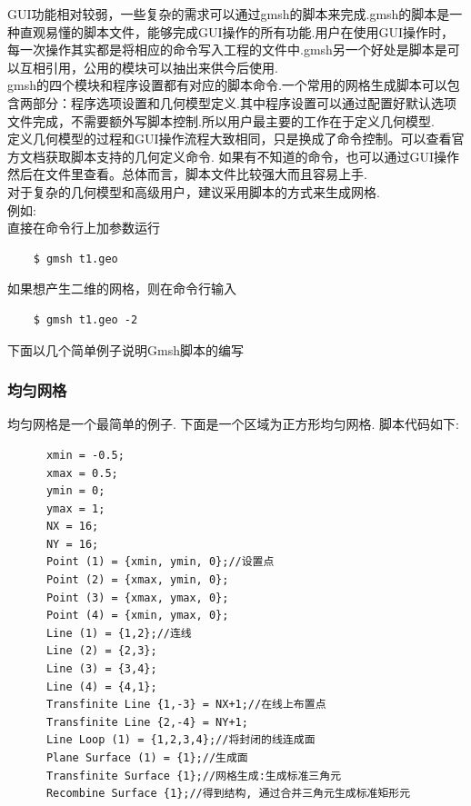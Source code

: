 \documentclass[12pt]{article}
\begin{document}
\begin{CJK}{UTF8}{gkai}
\qquad GUI功能相对较弱，一些复杂的需求可以通过gmsh的脚本来完成.gmsh的脚本是一种直观易懂的脚本文件，能够完成GUI操作的所有功能.用户在使用GUI操作时，每一次操作其实都是将相应的命令写入工程的文件中.gmsh另一个好处是脚本是可以互相引用，公用的模块可以抽出来供今后使用.\\
	
	gmsh的四个模块和程序设置都有对应的脚本命令.一个常用的网格生成脚本可以包含两部分：程序选项设置和几何模型定义.其中程序设置可以通过配置好默认选项文件完成，不需要额外写脚本控制.所以用户最主要的工作在于定义几何模型.\\
	
	定义几何模型的过程和GUI操作流程大致相同，只是换成了命令控制。可以查看官方文档获取脚本支持的几何定义命令. 如果有不知道的命令，也可以通过GUI操作然后在文件里查看。总体而言，脚本文件比较强大而且容易上手.\\
	
	对于复杂的几何模型和高级用户，建议采用脚本的方式来生成网格.\\
		
	例如:\\	
	
	直接在命令行上加参数运行	
	\begin{verbatim}
	$ gmsh t1.geo
	\end{verbatim}
	
	如果想产生二维的网格，则在命令行输入
	\begin{verbatim}
	$ gmsh t1.geo -2
	\end{verbatim}
	
    下面以几个简单例子说明Gmsh脚本的编写\\
    \subsubsection{均匀网格}
    均匀网格是一个最简单的例子. 下面是一个区域为正方形均匀网格. 脚本代码如下:\\
    \begin{verbatim}
      xmin = -0.5;
      xmax = 0.5;
      ymin = 0;
      ymax = 1; 
      NX = 16;
      NY = 16;
      Point (1) = {xmin, ymin, 0};//设置点 
      Point (2) = {xmax, ymin, 0}; 
      Point (3) = {xmax, ymax, 0}; 
      Point (4) = {xmin, ymax, 0}; 
      Line (1) = {1,2};//连线      
      Line (2) = {2,3};
      Line (3) = {3,4}; 
      Line (4) = {4,1};
      Transfinite Line {1,-3} = NX+1;//在线上布置点 
      Transfinite Line {2,-4} = NY+1;
      Line Loop (1) = {1,2,3,4};//将封闭的线连成面
      Plane Surface (1) = {1};//生成面
      Transfinite Surface {1};//网格生成:生成标准三角元  
      Recombine Surface {1};//得到结构, 通过合并三角元生成标准矩形元
    \end{verbatim}
 

\end{CJK}
\end{document}
